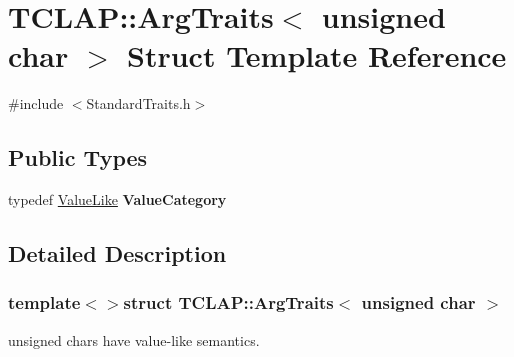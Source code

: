 \hypertarget{struct_t_c_l_a_p_1_1_arg_traits_3_01unsigned_01char_01_4}{\section{T\+C\+L\+A\+P\+:\+:Arg\+Traits$<$ unsigned char $>$ Struct Template Reference}
\label{struct_t_c_l_a_p_1_1_arg_traits_3_01unsigned_01char_01_4}
}


{\ttfamily \#include $<$Standard\+Traits.\+h$>$}

\subsection*{Public Types}
\begin{DoxyCompactItemize}
\item 
\hypertarget{struct_t_c_l_a_p_1_1_arg_traits_3_01unsigned_01char_01_4_a3cba1e41ab04d31c7b68b1c5e6e227aa}{typedef \hyperlink{struct_t_c_l_a_p_1_1_value_like}{Value\+Like} {\bfseries Value\+Category}}\label{struct_t_c_l_a_p_1_1_arg_traits_3_01unsigned_01char_01_4_a3cba1e41ab04d31c7b68b1c5e6e227aa}

\end{DoxyCompactItemize}


\subsection{Detailed Description}
\subsubsection*{template$<$$>$struct T\+C\+L\+A\+P\+::\+Arg\+Traits$<$ unsigned char $>$}

unsigned chars have value-\/like semantics. 